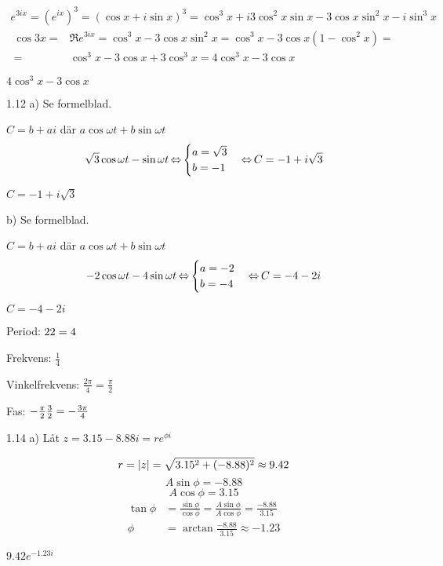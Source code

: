 \begin{task}{1.11}
	\begin{align*}
		e^{3ix}=
		(e^{ix})^3=
		(\cos x + i\sin x)^3=
		\cos^3x+i3\cos^2x\sin x-3\cos x\sin^2x-i\sin^3x
	\end{align*}
	\begin{align*}
	\cos 3x=
	&\Re e^{3ix}=
	\cos^3x-3\cos x\sin^2x=
	\cos^3x-3\cos x(1-\cos^2x)= \\ =
	&\cos^3x-3\cos x+3\cos^3x=
	4\cos^3x-3\cos x
	\end{align*}
	
	\ans $4\cos^3x-3\cos x$
\end{task}

\begin{task}{1.12 a)}
	Se formelblad.
	
	$C = b+ai$ där $a\cos\omega t + b\sin\omega t$
	\[\sqrt{3}\cos\omega t - \sin\omega t \operatorname{\Leftrightarrow}
	\begin{cases}
	a=\sqrt{3} \\
	b=-1
	\end{cases} \operatorname{\Leftrightarrow}
	C=-1+i\sqrt{3}\]
	
	\ans $C=-1+i\sqrt{3}$
\end{task}

\begin{task}{b)}
	Se formelblad.
	
	$C = b+ai$ där $a\cos\omega t + b\sin\omega t$
	\[-2\cos\omega t - 4\sin\omega t \operatorname{\Leftrightarrow}
	\begin{cases}
	a=-2 \\
	b=-4
	\end{cases} \operatorname{\Leftrightarrow}
	C=-4-2i\]
	
	\ans $C=-4-2i$
\end{task}

\begin{task}{1.13}
	Period: $2\*2=4$
	
	Frekvens: $\frac{1}{4}$
	
	Vinkelfrekvens: $\frac{2\pi}{4}=\frac{\pi}{2}$
	
	Fas: $-\frac{\pi}{2}\*\frac{3}{2}=-\frac{3\pi}{4}$
\end{task}

\begin{task}{1.14 a)}
	Låt $z=3.15-8.88i=re^{\phi i}$
	
	\[r=\left|z\right|=\sqrt{3.15^2+(-8.88)^2}\approx9.42\]
	\[A\sin\phi=-8.88\]
	\[A\cos\phi=3.15\]
	\begin{align*}
	\tan\phi&=
	\frac{\sin\phi}{\cos\phi}=
	\frac{A\sin\phi}{A\cos\phi}=
	\frac{-8.88}{3.15} \\
	\phi&=
	\arctan\frac{-8.88}{3.15}\approx 
	-1.23
	\end{align*}
	
	\ans $9.42e^{-1.23i}$
\end{task}
